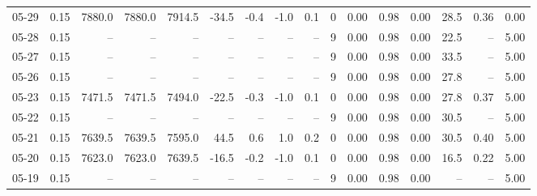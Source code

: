 \begin{threeparttable}
{\begin{tabular}{lrrrrrrrrrrrrrrr}
  05-29 &     0.15 & 7880.0 & 7880.0 & 7914.5 &      -34.5 &           -0.4 &                     -1.0 &                 0.1 &              0 &       0.00 &      0.98 &           0.00 &             28.5 &            0.36 &                   0.00 \\
  05-28 &     0.15 &     -- &     -- &     -- &         -- &             -- &                       -- &                  -- &              9 &       0.00 &      0.98 &           0.00 &             22.5 &              -- &                   5.00 \\
  05-27 &     0.15 &     -- &     -- &     -- &         -- &             -- &                       -- &                  -- &              9 &       0.00 &      0.98 &           0.00 &             33.5 &              -- &                   5.00 \\
  05-26 &     0.15 &     -- &     -- &     -- &         -- &             -- &                       -- &                  -- &              9 &       0.00 &      0.98 &           0.00 &             27.8 &              -- &                   5.00 \\
  05-23 &     0.15 & 7471.5 & 7471.5 & 7494.0 &      -22.5 &           -0.3 &                     -1.0 &                 0.1 &              0 &       0.00 &      0.98 &           0.00 &             27.8 &            0.37 &                   5.00 \\
  05-22 &     0.15 &     -- &     -- &     -- &         -- &             -- &                       -- &                  -- &              9 &       0.00 &      0.98 &           0.00 &             30.5 &              -- &                   5.00 \\
  05-21 &     0.15 & 7639.5 & 7639.5 & 7595.0 &       44.5 &            0.6 &                      1.0 &                 0.2 &              0 &       0.00 &      0.98 &           0.00 &             30.5 &            0.40 &                   5.00 \\
  05-20 &     0.15 & 7623.0 & 7623.0 & 7639.5 &      -16.5 &           -0.2 &                     -1.0 &                 0.1 &              0 &       0.00 &      0.98 &           0.00 &             16.5 &            0.22 &                   5.00 \\
  05-19 &     0.15 &     -- &     -- &     -- &         -- &             -- &                       -- &                  -- &              9 &       0.00 &      0.98 &           0.00 &               -- &              -- &                   5.00 \\

\end{tabular}}
\end{threeparttable}

